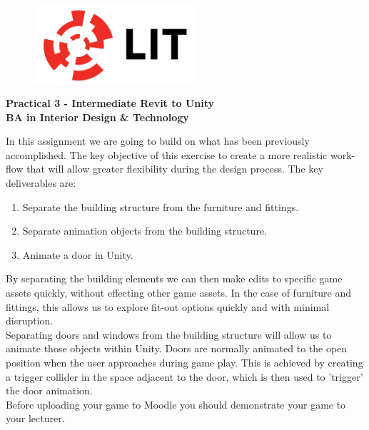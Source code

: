 
	

\newpage
\setcounter{page}{1}
\begin{center}
	\begin{figure}[ht]
		\centering
		\includegraphics[width = 6cm]{img/LITlogo.jpg}
		\label{fig:logoa3}
	\end{figure}
	\Large\textbf{Practical 3 - Intermediate Revit to Unity}\\
	\large\textbf{BA in Interior Design \& Technology}
\end{center}

In this assignment we are going to build on what has been previously accomplished. The key objective of this exercise to create a more realistic work-flow that will allow greater flexibility during the design process.  The key deliverables are:
\begin{enumerate}
	\item Separate the building structure from the furniture and fittings.
	\item Separate animation objects from the building structure.
	\item Animate a door in Unity.
\end{enumerate}

By separating the building elements we can then make edits to specific game assets quickly, without effecting other game assets.  In the case of furniture and fittings, this allows us to explore fit-out options quickly and with minimal disruption.\\

Separating doors and windows from the building structure will allow us to animate those objects within Unity.  Doors are normally animated to the open position when the user approaches during game play.  This is achieved by creating a trigger collider in the space adjacent to the door, which is then used to 'trigger' the door animation.\\

Before uploading your game to Moodle you should demonstrate your game to your lecturer.

